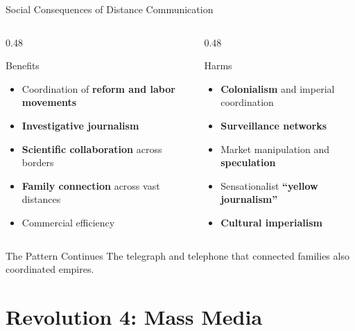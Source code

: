 \documentclass[aspectratio=169,11pt]{beamer}
\begin{document}
\begin{frame}{Social Consequences of Distance Communication}
\begin{columns}
\begin{column}{0.48\textwidth}
\begin{block}{\faThumbsUp\hspace{0.3em}Benefits}
\begin{itemize}
  \item Coordination of \textbf{reform and labor movements}
  \item \textbf{Investigative journalism}
  \item \textbf{Scientific collaboration} across borders
  \item \textbf{Family connection} across vast distances
  \item Commercial efficiency
\end{itemize}
\end{block}
\end{column}

\begin{column}{0.48\textwidth}
\begin{alertblock}{\faThumbsDown\hspace{0.3em}Harms}
\begin{itemize}
  \item \textbf{Colonialism} and imperial coordination
  \item \textbf{Surveillance networks}
  \item Market manipulation and \textbf{speculation}
  \item Sensationalist \textbf{``yellow journalism''}
  \item \textbf{Cultural imperialism}
\end{itemize}
\end{alertblock}
\end{column}
\end{columns}

\vspace{0.5em}
\begin{exampleblock}{The Pattern Continues}
The telegraph and telephone that connected families also coordinated empires.
\end{exampleblock}
\end{frame}


\section{Revolution 4: Mass Media}
\end{document}
